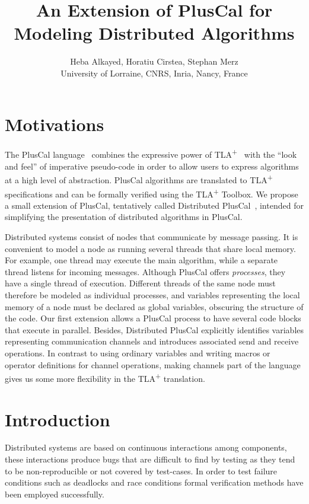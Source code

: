 \documentclass{article}
\title{An Extension of PlusCal for Modeling Distributed Algorithms}
\author{%
  Heba Alkayed, Horatiu Cirstea, Stephan Merz\\
  University of Lorraine, CNRS, Inria, Nancy, France%
}
\date{}
\newcommand{\tlaplus}{TLA\textsuperscript{+}\xspace}
\begin{document}

\maketitle


\section{Motivations}

The PlusCal language~\cite{pcalAlgo,wayne:practical} combines the expressive power of \tlaplus~\cite{tlabook} with the ``look and feel'' of imperative pseudo-code in order to allow users to express algorithms at a high level of abstraction. PlusCal algorithms are translated to \tlaplus specifications and can be formally verified using the \tlaplus Toolbox. We propose a small extension of PlusCal, tentatively called Distributed PlusCal~\cite{dpluscal}, intended for simplifying the presentation of distributed algorithms in PlusCal.

Distributed systems consist of nodes that communicate by message
passing. It is convenient to model a node as running several threads
that share local memory. For example, one thread may execute the main
algorithm, while a separate thread listens for incoming
messages. Although PlusCal offers \emph{processes}, they have a single
thread of execution. Different threads of the same node must therefore
be modeled as individual processes, and variables representing the
local memory of a node must be declared as global variables, obscuring
the structure of the code. Our first extension allows a PlusCal
process to have several code blocks that execute in parallel. Besides,
Distributed PlusCal explicitly identifies variables representing
communication channels and introduces associated send and receive
operations. In contrast to using ordinary variables and writing macros
or operator definitions for channel operations, making channels part
of the language gives us some more flexibility in the \tlaplus
translation. 

\section{Introduction}
Distributed systems are based on continuous interactions among components, these interactions produce bugs that are difficult to find by testing as they tend to be non-reproducible or not covered by test-cases. In order to test failure conditions such as deadlocks and race conditions formal verification methods have been employed successfully. 
\end{document}
